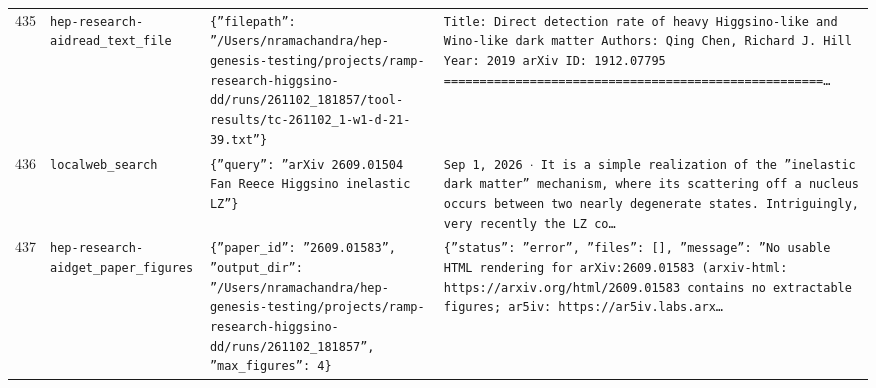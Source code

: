\documentclass[11pt,a4paper]{article}
\begin{document}
\begin{longtable}{@{}p{}p{}p{}p{}@{}}
435 & \texttt{hep-research-aid}\newline\texttt{read\_\allowbreak{}text\_\allowbreak{}file} & \texttt{\{''filepath'':\allowbreak{} ''/\allowbreak{}Users/\allowbreak{}nramachandra/\allowbreak{}hep-genesis-testing/\allowbreak{}projects/\allowbreak{}ramp-research-higgsino-dd/\allowbreak{}runs/\allowbreak{}261102\_\allowbreak{}181857/\allowbreak{}tool-results/\allowbreak{}tc-261102\_\allowbreak{}1-w1-d-21-39.txt''\}\allowbreak{}} & \texttt{Title:\allowbreak{} Direct detection rate of heavy Higgsino-like and Wino-like dark matter Authors:\allowbreak{} Qing Chen,\allowbreak{} Richard J. Hill Year:\allowbreak{} 2019 arXiv ID:\allowbreak{} 1912.07795  =\allowbreak{}=\allowbreak{}=\allowbreak{}=\allowbreak{}=\allowbreak{}=\allowbreak{}=\allowbreak{}=\allowbreak{}=\allowbreak{}=\allowbreak{}=\allowbreak{}=\allowbreak{}=\allowbreak{}=\allowbreak{}=\allowbreak{}=\allowbreak{}=\allowbreak{}=\allowbreak{}=\allowbreak{}=\allowbreak{}=\allowbreak{}=\allowbreak{}=\allowbreak{}=\allowbreak{}=\allowbreak{}=\allowbreak{}=\allowbreak{}=\allowbreak{}=\allowbreak{}=\allowbreak{}=\allowbreak{}=\allowbreak{}=\allowbreak{}=\allowbreak{}=\allowbreak{}=\allowbreak{}=\allowbreak{}=\allowbreak{}=\allowbreak{}=\allowbreak{}=\allowbreak{}=\allowbreak{}=\allowbreak{}=\allowbreak{}=\allowbreak{}=\allowbreak{}=\allowbreak{}=\allowbreak{}=\allowbreak{}=\allowbreak{}=\allowbreak{}=\allowbreak{}=\allowbreak{}\ldots{}\allowbreak{}} \\
436 & \texttt{local}\newline\texttt{web\_\allowbreak{}search} & \texttt{\{''query'':\allowbreak{} ''arXiv 2609.01504 Fan Reece Higgsino inelastic LZ''\}\allowbreak{}} & \texttt{Sep 1,\allowbreak{} 2026 $\cdot$ It is a simple realization of the ''inelastic dark matter'' mechanism,\allowbreak{} where its scattering off a nucleus occurs between two nearly degenerate states. Intriguingly,\allowbreak{} very recently the LZ co\ldots{}\allowbreak{}} \\
437 & \texttt{hep-research-aid}\newline\texttt{get\_\allowbreak{}paper\_\allowbreak{}figures} & \texttt{\{''paper\_\allowbreak{}id'':\allowbreak{} ''2609.01583'',\allowbreak{} ''output\_\allowbreak{}dir'':\allowbreak{} ''/\allowbreak{}Users/\allowbreak{}nramachandra/\allowbreak{}hep-genesis-testing/\allowbreak{}projects/\allowbreak{}ramp-research-higgsino-dd/\allowbreak{}runs/\allowbreak{}261102\_\allowbreak{}181857'',\allowbreak{} ''max\_\allowbreak{}figures'':\allowbreak{} 4\}\allowbreak{}} & \texttt{\{''status'':\allowbreak{} ''error'',\allowbreak{} ''files'':\allowbreak{} []\allowbreak{},\allowbreak{} ''message'':\allowbreak{} ''No usable HTML rendering for arXiv:\allowbreak{}2609.01583 (arxiv-html:\allowbreak{} https:\allowbreak{}/\allowbreak{}/\allowbreak{}arxiv.org/\allowbreak{}html/\allowbreak{}2609.01583 contains no extractable figures;\allowbreak{} ar5iv:\allowbreak{} https:\allowbreak{}/\allowbreak{}/\allowbreak{}ar5iv.labs.arx\ldots{}\allowbreak{}} \\

\end{longtable}
\end{document}
